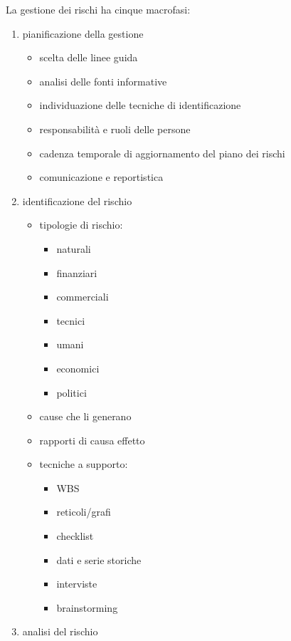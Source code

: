 \documentclass[answers, a4paper, 11pt]{exam}
\begin{document}
La gestione dei rischi ha cinque macrofasi:

\begin{enumerate}
    \item pianificazione della gestione
    \begin{itemize}
        \item scelta delle linee guida
        \item analisi delle fonti informative
        \item individuazione delle tecniche di identificazione
        \item responsabilità e ruoli delle persone
        \item cadenza temporale di aggiornamento del piano dei rischi
        \item comunicazione e reportistica
    \end{itemize}
    \item identificazione del rischio
    \begin{itemize}
        \item tipologie di rischio:
        \begin{itemize}
            \item naturali
            \item finanziari
            \item commerciali
            \item tecnici
            \item umani
            \item economici
            \item politici
        \end{itemize}
        \item cause che li generano
        \item rapporti di causa effetto
        \item tecniche a supporto:
        \begin{itemize}
            \item WBS
            \item reticoli/grafi
            \item checklist
            \item dati e serie storiche
            \item interviste
            \item brainstorming
        \end{itemize}
    \end{itemize}
    \item analisi del rischio

\end{enumerate}
\end{document}
